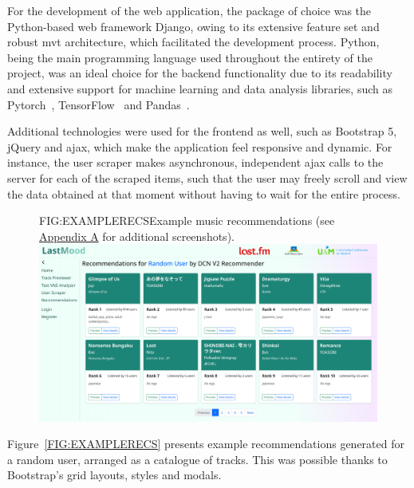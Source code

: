 For the development of the web application, the package of choice was the Python-based web framework Django, owing to its extensive feature set and robust \acs{mvt} architecture, which facilitated the development process. Python, being the main programming language used throughout the entirety of the project, was an ideal choice for the backend functionality due to its readability and extensive support for machine learning and data analysis libraries, such as Pytorch~\cite{PYTORCH}, TensorFlow~\cite{TENSORFLOW} and Pandas~\cite{PANDAS}.

Additional technologies were used for the frontend as well, such as Bootstrap 5, jQuery and \acs{ajax}, which make the application feel responsive and dynamic. For instance, the user scraper makes asynchronous, independent \acs{ajax} calls to the server for each of the scraped items, such that the user may freely scroll and view the data obtained at that moment without having to wait for the entire process.
\vspace{1em}
\begin{figure}[Example music recommendations]{FIG:EXAMPLERECS}{Example music recommendations (see \hyperref[AP:WEBAPP]{Appendix A} for additional screenshots).}\includegraphics[width=1\textwidth]{img/SSRecs.png}
\end{figure}

Figure~\ref{FIG:EXAMPLERECS} presents example recommendations generated for a random user, arranged as a catalogue of tracks. This was possible thanks to Bootstrap's grid layouts, styles and modals.